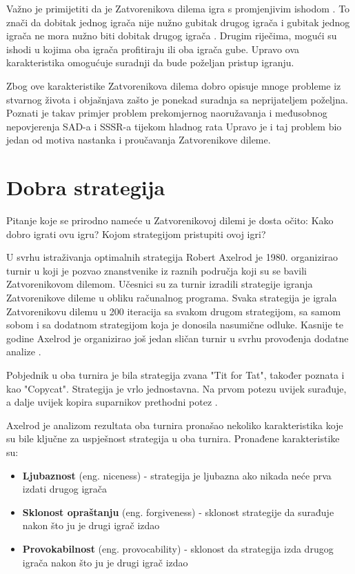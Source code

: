 \documentclass[zavrsnirad]{fer}
\begin{document}
	Važno je primijetiti da je Zatvorenikova dilema igra s promjenjivim ishodom \cite{PrisDilemmaHrEnc}. To znači da dobitak jednog igrača nije nužno gubitak drugog igrača i gubitak jednog igrača ne mora nužno biti dobitak drugog igrača \cite{igraHrEnc}. Drugim riječima, mogući su ishodi u kojima oba igrača profitiraju ili oba igrača gube. Upravo ova karakteristika omogućuje suradnji da bude poželjan pristup igranju. 
	 
	Zbog ove karakteristike Zatvorenikova dilema dobro opisuje mnoge probleme iz stvarnog života i objašnjava zašto je ponekad suradnja sa neprijateljem poželjna. Poznati je takav primjer problem prekomjernog naoružavanja i međusobnog nepovjerenja SAD-a i SSSR-a tijekom hladnog rata \cite{1980Axelrod1} Upravo je i taj problem bio jedan od motiva nastanka i proučavanja Zatvorenikove dileme.

	\section{Dobra strategija}
	
		Pitanje koje se prirodno nameće u Zatvorenikovoj dilemi je dosta očito: Kako dobro igrati ovu igru? Kojom strategijom pristupiti ovoj igri?

		U svrhu istraživanja optimalnih strategija Robert Axelrod je 1980. organizirao turnir \cite{1980Axelrod1} u koji je pozvao znanstvenike iz raznih područja koji su se bavili Zatvorenikovom dilemom. Učesnici su za turnir izradili strategije igranja Zatvorenikove dileme u obliku računalnog programa. Svaka strategija je igrala Zatvorenikovu dilemu u 200 iteracija sa svakom drugom strategijom, sa samom sobom i sa dodatnom strategijom koja je donosila nasumične odluke. Kasnije te godine Axelrod je organizirao još jedan sličan turnir u svrhu provođenja dodatne analize \cite{1980Axelrod2}.
	
		Pobjednik u oba turnira je bila strategija zvana "Tit for Tat", također poznata i kao "Copycat". Strategija je vrlo jednostavna. Na prvom potezu uvijek surađuje, a dalje uvijek kopira suparnikov prethodni potez \cite{1980Axelrod1}.
	
		Axelrod je analizom rezultata oba turnira pronašao nekoliko karakteristika koje su bile ključne za uspješnost strategija u oba turnira. Pronađene karakteristike su:
	
		\begin{itemize}
			\item \textbf{Ljubaznost} (eng. niceness) \cite{1980Axelrod1} - strategija je ljubazna ako nikada neće prva izdati drugog igrača
			\item \textbf{Sklonost opraštanju} (eng. forgiveness) \cite{1980Axelrod1} - sklonost strategije da surađuje nakon što ju je drugi igrač izdao
			\item \textbf{Provokabilnost} (eng. provocability) \cite{1980Axelrod2} - sklonost da strategija izda drugog igrača nakon što ju je drugi igrač izdao
		\end{itemize}
	
\end{document}
